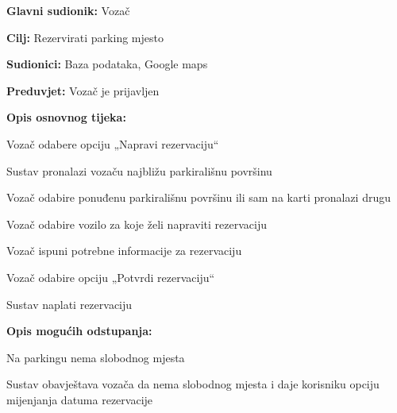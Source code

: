 					\begin{packed_item}
						
						\item  \textbf{Glavni sudionik: } Vozač
						\item  \textbf{Cilj:} Rezervirati parking mjesto
						\item  \textbf{Sudionici:} Baza podataka,  Google maps
						\item  \textbf{Preduvjet:} Vozač je prijavljen
						\item  \textbf{Opis osnovnog tijeka:}
						
						\item[] \begin{packed_enum}
							\item Vozač odabere opciju „Napravi rezervaciju“
							\item Sustav pronalazi vozaču najbližu parkirališnu površinu
							\item Vozač odabire ponuđenu parkirališnu površinu ili sam na karti pronalazi drugu
							\item Vozač odabire vozilo za koje želi napraviti rezervaciju
							\item Vozač ispuni potrebne informacije za rezervaciju
							\item Vozač odabire opciju „Potvrdi rezervaciju“
							\item Sustav naplati rezervaciju
						\end{packed_enum}
						
						\item  \textbf{Opis mogućih odstupanja:}
						
						\item[] \begin{packed_item}
							
							\item[3.a]  Na parkingu nema slobodnog mjesta
							\item[] \begin{packed_enum}
								
								\item Sustav obavještava vozača da nema slobodnog mjesta i daje korisniku opciju mijenjanja datuma rezervacije
								
							\end{packed_enum}
						\end{packed_item}
					\end{packed_item}
				
